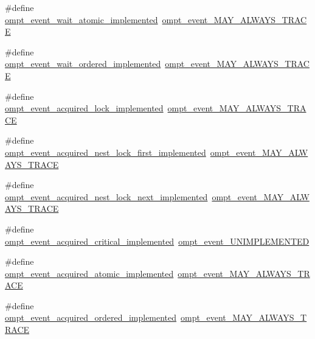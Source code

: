 \begin{DoxyCompactItemize}
\item 
\#define \hyperlink{ompt-event-specific_8h_ae25c672fecb70d4c104c7b141cb845d0}{ompt\-\_\-event\-\_\-wait\-\_\-atomic\-\_\-implemented}~\hyperlink{ompt-event-specific_8h_a81d63d53ff090774864cdd033effe56e}{ompt\-\_\-event\-\_\-\-M\-A\-Y\-\_\-\-A\-L\-W\-A\-Y\-S\-\_\-\-T\-R\-A\-C\-E}
\item 
\#define \hyperlink{ompt-event-specific_8h_a2700e8a9a1d49b921ffa1385d02dd47b}{ompt\-\_\-event\-\_\-wait\-\_\-ordered\-\_\-implemented}~\hyperlink{ompt-event-specific_8h_a81d63d53ff090774864cdd033effe56e}{ompt\-\_\-event\-\_\-\-M\-A\-Y\-\_\-\-A\-L\-W\-A\-Y\-S\-\_\-\-T\-R\-A\-C\-E}
\item 
\#define \hyperlink{ompt-event-specific_8h_a71f68129e0c8a7347cc3fa5ff3e33c61}{ompt\-\_\-event\-\_\-acquired\-\_\-lock\-\_\-implemented}~\hyperlink{ompt-event-specific_8h_a81d63d53ff090774864cdd033effe56e}{ompt\-\_\-event\-\_\-\-M\-A\-Y\-\_\-\-A\-L\-W\-A\-Y\-S\-\_\-\-T\-R\-A\-C\-E}
\item 
\#define \hyperlink{ompt-event-specific_8h_a641b24dcfd785a3952af825df59e795d}{ompt\-\_\-event\-\_\-acquired\-\_\-nest\-\_\-lock\-\_\-first\-\_\-implemented}~\hyperlink{ompt-event-specific_8h_a81d63d53ff090774864cdd033effe56e}{ompt\-\_\-event\-\_\-\-M\-A\-Y\-\_\-\-A\-L\-W\-A\-Y\-S\-\_\-\-T\-R\-A\-C\-E}
\item 
\#define \hyperlink{ompt-event-specific_8h_a8efdc3c6e6a78fbb4453a10d5e43c81e}{ompt\-\_\-event\-\_\-acquired\-\_\-nest\-\_\-lock\-\_\-next\-\_\-implemented}~\hyperlink{ompt-event-specific_8h_a81d63d53ff090774864cdd033effe56e}{ompt\-\_\-event\-\_\-\-M\-A\-Y\-\_\-\-A\-L\-W\-A\-Y\-S\-\_\-\-T\-R\-A\-C\-E}
\item 
\#define \hyperlink{ompt-event-specific_8h_ada1f66f789752fc48d51a6aeeed2e740}{ompt\-\_\-event\-\_\-acquired\-\_\-critical\-\_\-implemented}~\hyperlink{ompt-event-specific_8h_a5719430a79b410eee8d68fcec0fbf8f2}{ompt\-\_\-event\-\_\-\-U\-N\-I\-M\-P\-L\-E\-M\-E\-N\-T\-E\-D}
\item 
\#define \hyperlink{ompt-event-specific_8h_a760d3c216dcbc2d4637d73d7da9c1195}{ompt\-\_\-event\-\_\-acquired\-\_\-atomic\-\_\-implemented}~\hyperlink{ompt-event-specific_8h_a81d63d53ff090774864cdd033effe56e}{ompt\-\_\-event\-\_\-\-M\-A\-Y\-\_\-\-A\-L\-W\-A\-Y\-S\-\_\-\-T\-R\-A\-C\-E}
\item 
\#define \hyperlink{ompt-event-specific_8h_a337ae971f785872ce689ea67cfe7deae}{ompt\-\_\-event\-\_\-acquired\-\_\-ordered\-\_\-implemented}~\hyperlink{ompt-event-specific_8h_a81d63d53ff090774864cdd033effe56e}{ompt\-\_\-event\-\_\-\-M\-A\-Y\-\_\-\-A\-L\-W\-A\-Y\-S\-\_\-\-T\-R\-A\-C\-E}

\end{DoxyCompactItemize}
